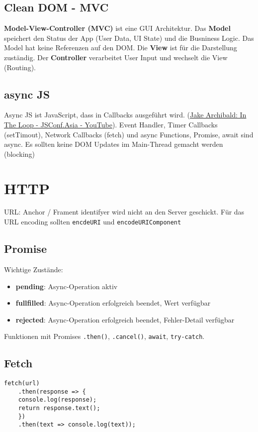 \documentclass[11pt,twoside,landscape]{article}
\begin{document}
\begin{multicols}{4}
\subsection{Clean DOM - MVC}
\label{sec:org67dc3d4}
\textbf{Model-View-Controller (MVC)} ist eine GUI Architektur. Das \textbf{Model} speichert den Status der App (User Data, UI State) und die Busniness Logic. Das Model hat keine Referenzen auf den DOM. Die \textbf{View} ist für die Darstellung zuständig. Der \textbf{Controller} verarbeitet User Input und wechselt die View (Routing).

\subsection{async JS}
\label{sec:orga9a5840}
Async JS ist JavaScript, dass in Callbacks ausgeführt wird. (\href{https://youtu.be/cCOL7MC4Pl0?t=411}{Jake Archibald: In The Loop - JSConf.Asia - YouTube}). Event Handler, Timer Callbacks (setTimout), Network Callbacks (fetch) und async Functions, Promise, await sind async. Es sollten keine DOM Updates im Main-Thread gemacht werden (blocking)


\section{HTTP}
\label{sec:orgd48c9cf}
URL: Anchor / Frament identifyer wird nicht an den Server geschickt. Für das URL encoding sollten \texttt{encdeURI} und \texttt{encodeURIComponent}


\subsection{Promise}
\label{sec:org8587e3b}
Wichtige Zustände:
\begin{itemize}
\item \textbf{pending}: Async-Operation aktiv
\item \textbf{fullfilled}: Async-Operation erfolgreich beendet, Wert verfügbar
\item \textbf{rejected}: Async-Operation erfolgreich beendet, Fehler-Detail verfügbar
\end{itemize}

Funktionen mit Promises \texttt{.then()}, \texttt{.cancel()}, \texttt{await}, \texttt{try-catch}.

\subsection{Fetch}
\label{sec:org7c8262f}
\lstset{language=js,label= ,caption= ,captionpos=b,numbers=none}
\begin{lstlisting}
fetch(url)
    .then(response => {
	console.log(response);
	return response.text();
    })
    .then(text => console.log(text));
\end{lstlisting}


\end{multicols}
\end{document}
